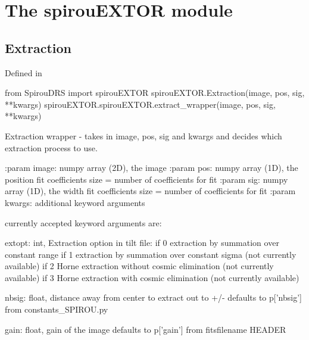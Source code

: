 
\clearpage
\newpage
\begin{minipage}{\textwidth}
\section{The spirouEXTOR module}
\label{ch:the_module:spirouEXTOR}

\subsection{Extraction}

Defined in \spirouEXTOR{}

\begin{pythonbox}
from SpirouDRS import spirouEXTOR
spirouEXTOR.Extraction(image, pos, sig, **kwargs)
spirouEXTOR.spirouEXTOR.extract_wrapper(image, pos, sig, **kwargs)
\end{pythonbox}

\begin{pythondocstring}
Extraction wrapper - takes in image, pos, sig and kwargs and decides
which extraction process to use.

:param image: numpy array (2D), the image
:param pos: numpy array (1D), the position fit coefficients
            size = number of coefficients for fit
:param sig: numpy array (1D), the width fit coefficients
            size = number of coefficients for fit
:param kwargs: additional keyword arguments

currently accepted keyword arguments are:

    extopt:         int, Extraction option in tilt file:
                     if 0 extraction by summation over constant range
                     if 1 extraction by summation over constant sigma
                        (not currently available)
                     if 2 Horne extraction without cosmic elimination
                        (not currently available)
                     if 3 Horne extraction with cosmic elimination
                        (not currently available)

    nbsig:          float,  distance away from center to extract out to +/-
                    defaults to p['nbsig'] from constants_SPIROU.py

    gain:           float, gain of the image
                    defaults to p['gain'] from fitsfilename HEADER


\end{pythondocstring}
\end{minipage}
